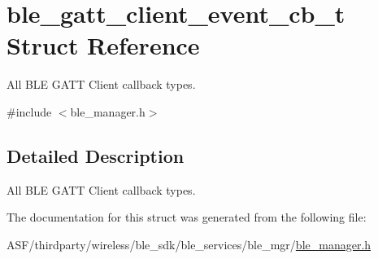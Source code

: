 \hypertarget{structble__gatt__client__event__cb__t}{}\section{ble\+\_\+gatt\+\_\+client\+\_\+event\+\_\+cb\+\_\+t Struct Reference}
\label{structble__gatt__client__event__cb__t}


All B\+LE G\+A\+TT Client callback types.  




{\ttfamily \#include $<$ble\+\_\+manager.\+h$>$}



\subsection{Detailed Description}
All B\+LE G\+A\+TT Client callback types. 

The documentation for this struct was generated from the following file\+:\begin{DoxyCompactItemize}
\item 
A\+S\+F/thirdparty/wireless/ble\+\_\+sdk/ble\+\_\+services/ble\+\_\+mgr/\mbox{\hyperlink{ble__manager_8h}{ble\+\_\+manager.\+h}}\end{DoxyCompactItemize}
